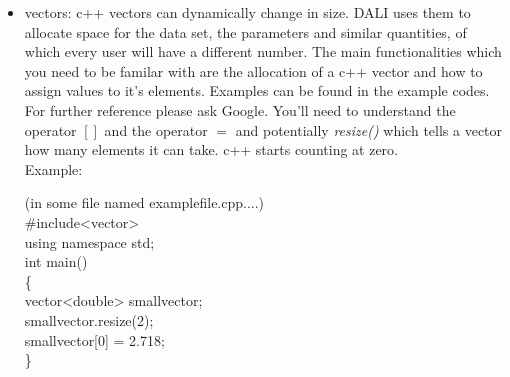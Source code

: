 \documentclass[12pt,twoside]{extarticle}
\newenvironment{file}{\begin{fBox}}{\hfill{\color{dalifile}}\end{fBox}}
\begin{document}
\begin{itemize}
\item vectors: c++ vectors can dynamically change in size. DALI uses them to allocate space for the data set, the parameters and similar quantities, of which every user will have a different number. The main functionalities which you need to be familar with are the allocation of a c++ vector and how to assign values to it's elements. Examples can be found in the example codes. For further reference please ask Google. You'll need to understand the operator $[]$ and the operator $=$ and potentially \emph{resize()} which tells a vector how many elements it can take. c++ starts counting at zero.\\
Example:\\
\begin{file}
(in some file named examplefile.cpp....)\\
\#include<vector>\\
using namespace std;\\

int main()\\
\{\\
 vector<double> smallvector;\\
 smallvector.resize(2);\\
 smallvector[0] = 2.718;\\
\}\\
\end{file}


\end{itemize}
\end{document}
